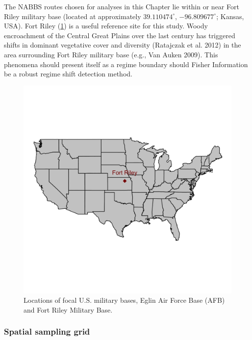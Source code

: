 \documentclass[12pt,twoside,openany]{reedthesis}
\begin{document}
The NABBS routes chosen for analyses in this Chapter lie within or near
Fort Riley military base (located at approximately
\(39.110474^{\circ}\), \(-96.809677^{\circ}\); Kansas, USA). Fort Riley
(\ref{fig:basesOfInterestMap}) is a useful reference site for this
study. Woody encroachment of the Central Great Plains over the last
century has triggered shifts in dominant vegetative cover and diversity
(Ratajczak et al. 2012) in the area surrounding Fort Riley military base
(e.g., Van Auken 2009). This phenomena should present itself as a regime
boundary should Fisher Information be a robust regime shift detection
method.
\begin{figure}

{\centering \includegraphics[width=0.95\linewidth]{./chapterFiles/fisherSpatial/figures/figsCalledInDiss/basesOfInterestMap} 

}

\caption{Locations of focal U.S. military bases, Eglin Air Force Base (AFB) and Fort Riley Military Base.}\label{fig:basesOfInterestMap}
\end{figure}
\subsubsection{Spatial sampling grid}\label{spatial-sampling-grid}
\end{document}
